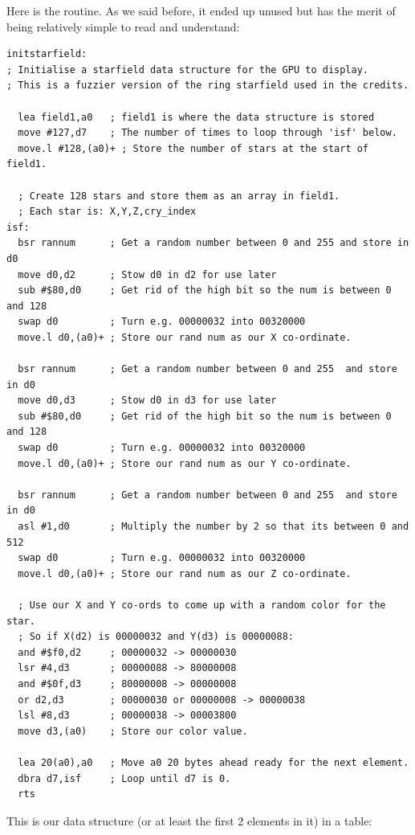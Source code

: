 Here is the routine. As we said before, it ended up unused but has the merit of being relatively simple to read and understand:
\begin{lstlisting}
initstarfield:
; Initialise a starfield data structure for the GPU to display.
; This is a fuzzier version of the ring starfield used in the credits.

  lea field1,a0   ; field1 is where the data structure is stored
  move #127,d7    ; The number of times to loop through 'isf' below.
  move.l #128,(a0)+ ; Store the number of stars at the start of field1.

  ; Create 128 stars and store them as an array in field1.
  ; Each star is: X,Y,Z,cry_index
isf:
  bsr rannum      ; Get a random number between 0 and 255 and store in d0
  move d0,d2      ; Stow d0 in d2 for use later
  sub #$80,d0     ; Get rid of the high bit so the num is between 0 and 128
  swap d0         ; Turn e.g. 00000032 into 00320000
  move.l d0,(a0)+ ; Store our rand num as our X co-ordinate.

  bsr rannum      ; Get a random number between 0 and 255  and store in d0
  move d0,d3      ; Stow d0 in d3 for use later
  sub #$80,d0     ; Get rid of the high bit so the num is between 0 and 128
  swap d0         ; Turn e.g. 00000032 into 00320000
  move.l d0,(a0)+ ; Store our rand num as our Y co-ordinate.

  bsr rannum      ; Get a random number between 0 and 255  and store in d0
  asl #1,d0       ; Multiply the number by 2 so that its between 0 and 512
  swap d0         ; Turn e.g. 00000032 into 00320000
  move.l d0,(a0)+ ; Store our rand num as our Z co-ordinate.

  ; Use our X and Y co-ords to come up with a random color for the star.
  ; So if X(d2) is 00000032 and Y(d3) is 00000088:
  and #$f0,d2     ; 00000032 -> 00000030
  lsr #4,d3       ; 00000088 -> 80000008
  and #$0f,d3     ; 80000008 -> 00000008
  or d2,d3        ; 00000030 or 00000008 -> 00000038
  lsl #8,d3       ; 00000038 -> 00003800
  move d3,(a0)    ; Store our color value.

  lea 20(a0),a0   ; Move a0 20 bytes ahead ready for the next element.
  dbra d7,isf     ; Loop until d7 is 0.
  rts
\end{lstlisting}
\clearpage

This is our data structure (or at least the first 2 elements in it) in a table:

